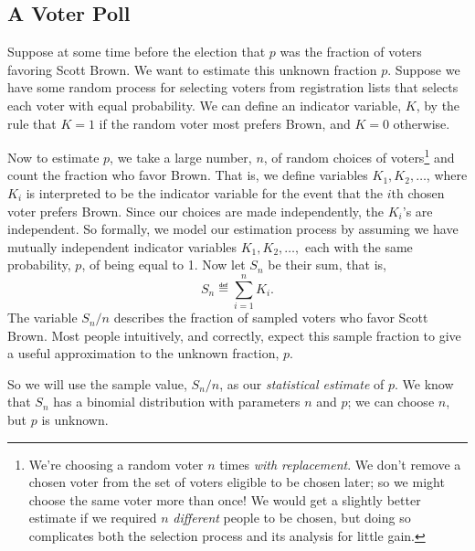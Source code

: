 \iffalse
\footnote{We can only keep our fingers crossed for this race to happen --
when they ran against each other for the U.S. Senate in 2000, they
generated some of the best entertainment in TV history.}  \fi

\subsection{A Voter Poll}
\iffalse
How did polling give an advance estimate of the fraction of the
Massachusetts voters who favored Scott Brown over his Democratic
opponent?
\fi

Suppose at some time before the election that $p$ was the fraction of
voters favoring Scott Brown.  We want to estimate this unknown
fraction $p$.  Suppose we have some random process for selecting
voters from registration lists that selects each voter with equal
probability.  We can define an indicator variable, $K$, by the rule
that $K=1$ if the random voter most prefers Brown, and $K=0$
otherwise.

Now to estimate $p$, we take a large number, $n$, of random choices of
voters\footnote{We're choosing a random voter $n$ times \emph{with
    replacement}.  We don't remove a chosen voter from the set of
  voters eligible to be chosen later; so we might choose the same
  voter more than once!  We would get a slightly better estimate if we
  required $n$ \emph{different} people to be chosen, but doing so
  complicates both the selection process and its analysis for little
  gain.}  and count the fraction who favor Brown.  That is, we define
variables $K_1, K_2, \dots$, where $K_i$ is interpreted to be the
indicator variable for the event that the $i$th chosen voter prefers
Brown.  Since our choices are made independently, the $K_i$'s are
independent.  So formally, we model our estimation process by assuming
we have mutually independent indicator variables $K_1, K_2, \dots,$
each with the same probability, $p$, of being equal to 1.  Now let
$S_n$ be their sum, that is,
\begin{equation}\label{LN12:Sn}
S_n \eqdef \sum_{i=1}^n K_i.
\end{equation}
The variable $S_n/n$ describes the fraction of sampled voters who
favor Scott Brown.  Most people intuitively, and correctly, expect this sample
fraction to give a useful approximation to the unknown fraction, $p$.

\iffalse Note that
\[
\expect{\frac{S_n}{n}} = \sum_{i=1}^n \expect{K_i} = pn.
\]
\fi

So we will use the sample value, $S_n/n$, as our \emph{statistical
  estimate} of $p$.  We know that $S_n$ has a binomial distribution
with parameters $n$ and $p$; we can choose $n$, but $p$ is unknown.

